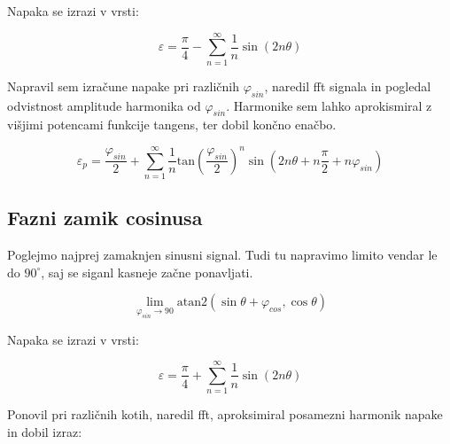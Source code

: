 
Napaka se izrazi v vrsti:

\begin{equation}
\varepsilon = \frac{\pi}{4} - \sum_{n=1}^{\infty}\frac{1}{n} \sin (2n \theta)
\end{equation}


Napravil sem izračune napake pri različnih $\varphi_{sin}$, naredil fft signala in pogledal odvistnost amplitude harmonika od $\varphi_{sin}$. Harmonike sem lahko aprokismiral z višjimi potencami funkcije tangens, ter dobil končno enačbo.


\begin{equation}
\label{vrsta_faza_sin}
\varepsilon_p = \frac{\varphi_{sin}}{2} + \sum_{n=1}^{\infty}\frac{1}{n} \mathrm{tan}(\frac{\varphi_{sin}}{2})^n \sin (2n \theta+n \frac{\pi}{2}+n \varphi_{sin})
\end{equation}




\subsection{Fazni zamik cosinusa}

Poglejmo najprej zamaknjen sinusni signal. Tudi tu napravimo limito vendar le do $90^\circ$, saj se siganl kasneje začne ponavljati.



\begin{equation}
\lim_{\varphi_{sin} \rightarrow 90} \mathrm{atan2}(\sin{\theta+\varphi_{cos}} ,\cos{\theta}) 
\end{equation}



Napaka se izrazi v vrsti:

\begin{equation}
\varepsilon = \frac{\pi}{4} + \sum_{n=1}^{\infty}\frac{1}{n} \sin (2n \theta)
\end{equation}


Ponovil pri različnih kotih, naredil fft, aproksimiral posamezni harmonik napake in dobil izraz:



